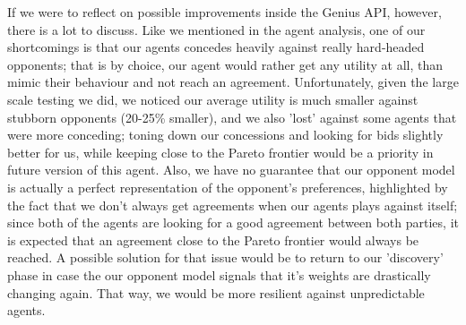 \documentclass{article}
\begin{document}
\begin{enumerate}
If we were to reflect on possible improvements inside the Genius API, however, there is a lot to discuss. Like we mentioned in the agent analysis, one of our shortcomings is that our agents concedes heavily against really hard-headed opponents; that is by choice, our agent would rather get any utility at all, than mimic their behaviour and not reach an agreement. Unfortunately, given the large scale testing we did, we noticed our average utility is much smaller against stubborn opponents (20-25\% smaller), and we also 'lost' against some agents that were more conceding; toning down our concessions and looking for bids slightly better for us, while keeping close to the Pareto frontier would be a priority in future version of this agent.  Also, we have no guarantee that our opponent model is actually a perfect representation of the opponent's preferences, highlighted by the fact that we don't always get agreements when our agents plays against itself; since both of the agents are looking for a good agreement between both parties, it is expected that an agreement close to the Pareto frontier would always be reached. A possible solution for that issue would be to return to our 'discovery' phase in case the our opponent model signals that it's weights are drastically changing again. That way, we would be more resilient against unpredictable agents.

\end{enumerate}



\end{document}
